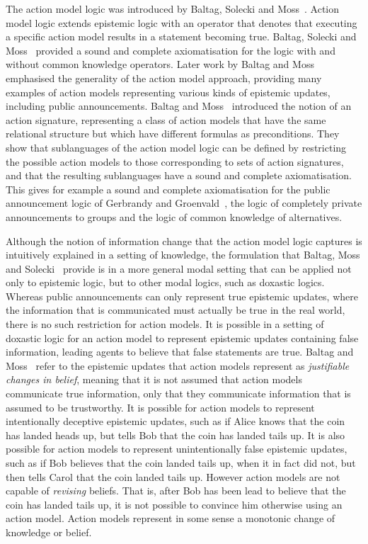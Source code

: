 The action model logic was introduced by Baltag, Solecki and Moss~\cite{baltag:1998, baltag:1999}.
Action model logic extends epistemic logic with an operator that denotes that executing a specific action model results in a statement becoming true.
Baltag, Solecki and Moss~\cite{baltag:1998} provided a sound and complete axiomatisation for the logic with and without common knowledge operators.
Later work by Baltag and Moss~\cite{baltag:2004} emphasised the generality of the action model approach, providing many examples of action models representing various kinds of epistemic updates, including public announcements.
Baltag and Moss~\cite{baltag:2004} introduced the notion of an action signature, representing a class of action models that have the same relational structure but which have different formulas as preconditions.
They show that sublanguages of the action model logic can be defined by restricting the possible action models to those corresponding to sets of action signatures, and that the resulting sublanguages have a sound and complete axiomatisation.
This gives for example a sound and complete axiomatisation for the public announcement logic of Gerbrandy and Groenvald~\cite{gerbrandy:1997}, the logic of completely private announcements to groups and the logic of common knowledge of alternatives.

Although the notion of information change that the action model logic captures is intuitively explained in a setting of knowledge, the formulation that Baltag, Moss and Solecki~\cite{baltag:1998} provide is in a more general modal setting that can be applied not only to epistemic logic, but to other modal logics, such as doxastic logics.
Whereas public announcements can only represent true epistemic updates, where the information that is communicated must actually be true in the real world, there is no such restriction for action models.
It is possible in a setting of doxastic logic for an action model to represent epistemic updates containing false information, leading agents to believe that false statements are true.
Baltag and Moss~\cite{baltag:2004} refer to the epistemic updates that action models represent as {\em justifiable changes in belief}, meaning that it is not assumed that action models communicate true information, only that they communicate information that is assumed to be trustworthy.
It is possible for action models to represent intentionally deceptive epistemic updates, such as if Alice knows that the coin has landed heads up, but tells Bob that the coin has landed tails up.
It is also possible for action models to represent unintentionally false epistemic updates, such as if Bob believes that the coin landed tails up, when it in fact did not, but then tells Carol that the coin landed tails up. 
However action models are not capable of {\em revising} beliefs.
That is, after Bob has been lead to believe that the coin has landed tails up, it is not possible to convince him otherwise using an action model.
Action models represent in some sense a monotonic change of knowledge or belief.


